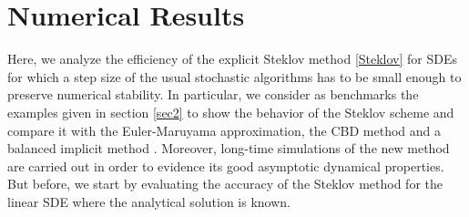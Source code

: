 \section{Numerical Results}\label{sec5}
   Here, we analyze the efficiency of the  explicit Steklov method \eqref{Steklov} for
  SDEs for which a step size of the usual stochastic algorithms has to be  small  enough
  to preserve numerical stability. In particular, we consider as benchmarks the examples
  given in section \ref{sec2} to show the behavior of the Steklov scheme and compare it
  with the Euler-Maruyama approximation, the CBD method \cite{Braanka1998} and a 
  balanced implicit method \cite{Schurz2007}. Moreover, long-time simulations of the new method
  are carried out in order to evidence  its good asymptotic dynamical properties.  But
  before, we start by evaluating the accuracy of the Steklov method for the linear SDE
  where the analytical solution is known.
